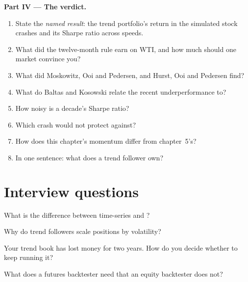 \begin{problem}
\medskip\noindent\textbf{Part IV --- The verdict.}
\begin{enumerate}[resume]
\item State the \emph{named result}: the trend portfolio's return in the simulated stock crashes and its Sharpe ratio across speeds.
\item What did the twelve-month rule earn on WTI, and how much should one market convince you?
\item What did Moskowitz, Ooi and Pedersen, and Hurst, Ooi and Pedersen find?
\item What do Baltas and Kosowski relate the recent underperformance to?
\item How noisy is a decade's Sharpe ratio?
\item Which crash would  not protect against?
\item How does this chapter's momentum differ from chapter~5's?
\item In one sentence: what does a trend follower own?
\end{enumerate}
\end{problem}

\section{Interview questions}

\begin{interviewq}\label{iq:s1:trend-following:1}
What is the difference between time-series and ?
\end{interviewq}

\begin{interviewq}\label{iq:s1:trend-following:2}
Why do trend followers scale positions by volatility?
\end{interviewq}

\begin{interviewq}\label{iq:s1:trend-following:3}
Your trend book has lost money for two years. How do you decide whether to keep running it?
\end{interviewq}

\begin{interviewq}\label{iq:s1:trend-following:4}
What does a futures backtester need that an equity backtester does not?
\end{interviewq}

